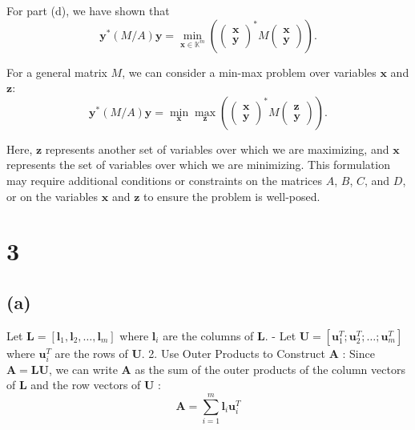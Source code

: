 \documentclass{article}
\begin{document}
For part (d), we have shown that
\[ \boldsymbol{y}^*(M/A)\boldsymbol{y} = \min_{\boldsymbol{x} \in \mathbb{K}^m} \left(\begin{pmatrix} \boldsymbol{x} \\ \boldsymbol{y} \end{pmatrix}^* M \begin{pmatrix} \boldsymbol{x} \\ \boldsymbol{y} \end{pmatrix}\right). \]

For a general matrix \( M \), we can consider a min-max problem over variables \( \boldsymbol{x} \) and \( \boldsymbol{z} \):
\[ \boldsymbol{y}^*(M/A)\boldsymbol{y} = \min_{\boldsymbol{x}} \max_{\boldsymbol{z}} \left(\begin{pmatrix} \boldsymbol{x} \\ \boldsymbol{y} \end{pmatrix}^* M \begin{pmatrix} \boldsymbol{z} \\ \boldsymbol{y} \end{pmatrix}\right). \]

Here, \( \boldsymbol{z} \) represents another set of variables over which we are maximizing, and \( \boldsymbol{x} \) represents the set of variables over which we are minimizing. This formulation may require additional conditions or constraints on the matrices \( A \), \( B \), \( C \), and \( D \), or on the variables \( \boldsymbol{x} \) and \( \boldsymbol{z} \) to ensure the problem is well-posed.

\section{3}
\subsection{(a)}
Let $\boldsymbol{L}=\left[\boldsymbol{l}_1, \boldsymbol{l}_2, \ldots, \boldsymbol{l}_m\right]$ where $\boldsymbol{l}_i$ are the columns of $\boldsymbol{L}$.
- Let $\boldsymbol{U}=\left[\boldsymbol{u}_1^T ; \boldsymbol{u}_2^T ; \ldots ; \boldsymbol{u}_m^T\right]$ where $\boldsymbol{u}_i^T$ are the rows of $\boldsymbol{U}$.
2. Use Outer Products to Construct $\boldsymbol{A}$ :
Since $\boldsymbol{A}=\boldsymbol{L U}$, we can write $\boldsymbol{A}$ as the sum of the outer products of the column vectors of $\boldsymbol{L}$ and the row vectors of $\boldsymbol{U}$ :
$$
\boldsymbol{A}=\sum_{i=1}^m \boldsymbol{l}_i \boldsymbol{u}_i^T
$$
\end{document}
